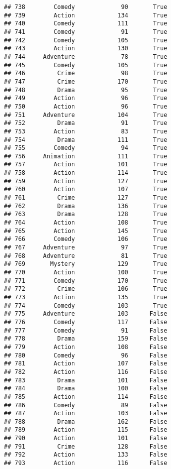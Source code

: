 \documentclass[
]{article}
\begin{document}
\begin{verbatim}
## 738        Comedy             90       True
## 739        Action            134       True
## 740        Comedy            111       True
## 741        Comedy             91       True
## 742        Comedy            105       True
## 743        Action            130       True
## 744     Adventure             78       True
## 745        Comedy            105       True
## 746         Crime             98       True
## 747         Crime            170       True
## 748         Drama             95       True
## 749        Action             96       True
## 750        Action             96       True
## 751     Adventure            104       True
## 752         Drama             91       True
## 753        Action             83       True
## 754         Drama            111       True
## 755        Comedy             94       True
## 756     Animation            111       True
## 757        Action            101       True
## 758        Action            114       True
## 759        Action            127       True
## 760        Action            107       True
## 761         Crime            127       True
## 762         Drama            136       True
## 763         Drama            128       True
## 764        Action            108       True
## 765        Action            145       True
## 766        Comedy            106       True
## 767     Adventure             97       True
## 768     Adventure             81       True
## 769       Mystery            129       True
## 770        Action            100       True
## 771        Comedy            170       True
## 772         Crime            106       True
## 773        Action            135       True
## 774        Comedy            103       True
## 775     Adventure            103      False
## 776        Comedy            117      False
## 777        Comedy             91      False
## 778         Drama            159      False
## 779        Action            108      False
## 780        Comedy             96      False
## 781        Action            107      False
## 782        Action            116      False
## 783         Drama            101      False
## 784         Drama            100      False
## 785        Action            114      False
## 786        Comedy             89      False
## 787        Action            103      False
## 788         Drama            162      False
## 789        Action            115      False
## 790        Action            101      False
## 791         Crime            128      False
## 792        Action            133      False
## 793        Action            116      False

\end{verbatim}
\end{document}
